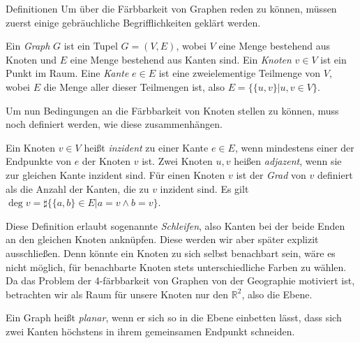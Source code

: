 \begin{chapter}{Definitionen}
  Um über die Färbbarkeit von Graphen reden zu können, müssen zuerst einige gebräuchliche Begrifflichkeiten geklärt werden. 
  \begin{definition}
   Ein \textit{Graph} $G$ ist ein Tupel $G=(V,E)$, wobei $V$ eine Menge bestehend aus Knoten und $E$ eine Menge bestehend aus Kanten sind. Ein \textit{Knoten} $v \in V$ ist ein Punkt im Raum. Eine \textit{Kante} $e \in E$ ist eine zweielementige Teilmenge von $V$, wobei $E$ die Menge aller dieser Teilmengen ist, also $E = \{\{u,v\}|u,v \in V\}$.
  \end{definition}
  
  Um nun Bedingungen an die Färbbarkeit von Knoten stellen zu können, muss noch definiert werden, wie diese zusammenhängen.
  
  \begin{definition}
   Ein Knoten $v \in V$ heißt \textit{inzident} zu einer Kante $e \in E$, wenn mindestens einer der Endpunkte von $e$ der Knoten $v$ ist. Zwei Knoten $u,v$ heißen \textit{adjazent}, wenn sie zur gleichen Kante inzident sind. Für einen Knoten $v$ ist der \textit{Grad} von $v$ definiert als die Anzahl der Kanten, die zu $v$ inzident sind. Es gilt $\deg v = \sharp\{\{a,b\} \in E | a=v \wedge b=v \}$.
  \end{definition}
  
  Diese Definition erlaubt sogenannte \textit{Schleifen}, also Kanten bei der beide Enden an den gleichen Knoten anknüpfen. Diese werden wir aber später explizit ausschließen. Denn könnte ein Knoten zu sich selbst benachbart sein, wäre es nicht möglich, für benachbarte Knoten stets unterschiedliche Farben zu wählen.\\
  Da das Problem der 4-färbbarkeit von Graphen von der Geographie motiviert ist, betrachten wir als Raum für unsere Knoten nur den $\mathbb{R}^2$, also die Ebene.
  
  \begin{definition}[Planarität]
   Ein Graph heißt \textit{planar}, wenn er sich so in die Ebene einbetten lässt, dass sich zwei Kanten höchstens in ihrem gemeinsamen Endpunkt schneiden.
  \end{definition}
  
  \begin{definition}[Färbung]
   
  \end{definition}

\end{chapter}
